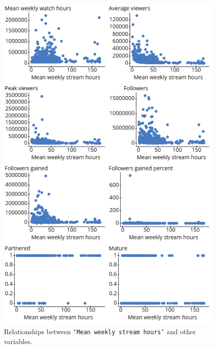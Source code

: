 \documentclass[12pt]{article}
\begin{document}
\begin{figure}[H]
  \centering
  \includegraphics[width=0.795\linewidth]{../StatCrunch_Results/stream_scatter_plot_matrix.png}
  \captionsetup{justification=centering, singlelinecheck=false, margin=2cm}
  \caption[Stream Hours Scatter Plot Matrix]{Relationships between \texttt{`Mean weekly stream hours'} and other variables.}
  \label{fig:stream_scatter_matrix}
\end{figure}
\end{document}
